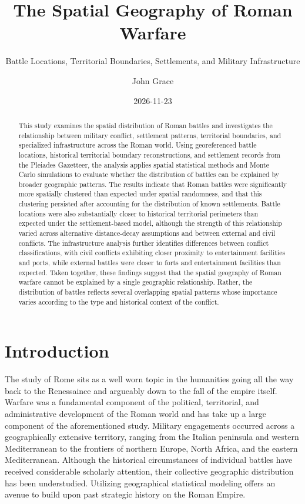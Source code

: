 \documentclass[
  letterpaper,
  DIV=11,
  numbers=noendperiod]{scrartcl}
\title{The Spatial Geography of Roman Warfare}
\subtitle{Battle Locations, Territorial Boundaries, Settlements, and
Military Infrastructure}
\author{John Grace}
\date{2026-11-23}
\begin{document}
\maketitle
\begin{abstract}
This study examines the spatial distribution of Roman battles and
investigates the relationship between military conflict, settlement
patterns, territorial boundaries, and specialized infrastructure across
the Roman world. Using georeferenced battle locations, historical
territorial boundary reconstructions, and settlement records from the
Pleiades Gazetteer, the analysis applies spatial statistical methods and
Monte Carlo simulations to evaluate whether the distribution of battles
can be explained by broader geographic patterns. The results indicate
that Roman battles were significantly more spatially clustered than
expected under spatial randomness, and that this clustering persisted
after accounting for the distribution of known settlements. Battle
locations were also substantially closer to historical territorial
perimeters than expected under the settlement-based model, although the
strength of this relationship varied across alternative distance-decay
assumptions and between external and civil conflicts. The infrastructure
analysis further identifies differences between conflict
classifications, with civil conflicts exhibiting closer proximity to
entertainment facilities and ports, while external battles were closer
to forts and entertainment facilities than expected. Taken together,
these findings suggest that the spatial geography of Roman warfare
cannot be explained by a single geographic relationship. Rather, the
distribution of battles reflects several overlapping spatial patterns
whose importance varies according to the type and historical context of
the conflict.
\end{abstract}


\section{Introduction}\label{introduction}

The study of Rome sits as a well worn topic in the humanities going all
the way back to the Renessaince and argueably down to the fall of the
empire itself. Warfare was a fundamental component of the political,
territorial, and administrative development of the Roman world and has
take up a large component of the aforementioned study. Military
engagements occurred across a geographically extensive territory,
ranging from the Italian peninsula and western Mediterranean to the
frontiers of northern Europe, North Africa, and the eastern
Mediterranean. Although the historical circumstances of individual
battles have received considerable scholarly attention, their collective
geographic distribution has been understudied. Utilizing geographical
statistical modeling offers an avenue to build upon past strategic
history on the Roman Empire.
\end{document}
